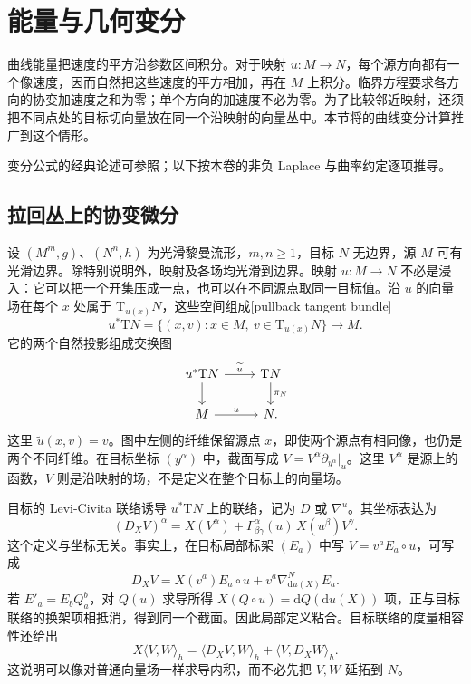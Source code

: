 
% 
% 

\section{能量与几何变分}
\label{g3:sec:1801}

曲线能量把速度的平方沿参数区间积分。对于映射 \(u:M\to N\)，每个源方向都有一个像速度，因而自然把这些速度的平方相加，再在 \(M\) 上积分。临界方程要求各方向的协变加速度之和为零；单个方向的加速度不必为零。为了比较邻近映射，还须把不同点处的目标切向量放在同一个沿映射的向量丛中。本节将的曲线变分计算推广到这个情形。

\ProseParagraphBreak

变分公式的经典论述可参照\cite[第2节，第115--117页；第6.C节，第135--136页]{EellsSampson1964HarmonicMaps}；以下按本卷的非负 Laplace 与曲率约定逐项推导。

\subsection{拉回丛上的协变微分}
\label{g3:subsec:1801:01}
设 \((M^m,g)\)、\((N^n,h)\) 为光滑黎曼流形，\(m,n\ge1\)，目标 \(N\) 无边界，源 \(M\) 可有光滑边界。除特别说明外，映射及各场均光滑到边界。映射 \(u:M\to N\) 不必是浸入：它可以把一个开集压成一点，也可以在不同源点取同一目标值。沿 \(u\) 的向量场在每个 \(x\) 处属于 \(\mathrm T_{u(x)}N\)，这些空间组成[pullback tangent bundle]
\[
	u^*\mathrm TN=\{(x,v):x\in M,\ v\in\mathrm T_{u(x)}N\}\longrightarrow M.
\]
它的两个自然投影组成交换图
\[
	\begin{tikzcd}
		u^*\mathrm TN \arrow[r,"\widetilde u"] \arrow[d] & \mathrm TN \arrow[d,"\pi_N"]\\
		M \arrow[r,"u"] & N.
	\end{tikzcd}
\]
这里 \(\widetilde u(x,v)=v\)。图中左侧的纤维保留源点 \(x\)，即使两个源点有相同像，也仍是两个不同纤维。在目标坐标 \((y^\alpha)\) 中，截面写成 \(V=V^\alpha\partial_{y^\alpha}|_u\)。这里 \(V^\alpha\) 是源上的函数，\(V\) 则是沿映射的场，不是定义在整个目标上的向量场。

\ProseParagraphBreak

目标的 Levi-Civita 联络诱导 \(u^*\mathrm TN\) 上的联络，记为 \(D\) 或 \(\nabla^u\)。其坐标表达为
\begin{equation}\label{g3:eq:pullback-connection-coordinates}
	(D_XV)^\alpha
	=X(V^\alpha)+\Gamma^\alpha_{\beta\gamma}(u)\,X(u^\beta)V^\gamma.
\end{equation}
这个定义与坐标无关。事实上，在目标局部标架 \((E_a)\) 中写 \(V=v^aE_a\circ u\)，可写成
\[
	D_XV=X(v^a)E_a\circ u+v^a\nabla^N_{\mathrm du(X)}E_a.
\]
若 \(E'_a=E_bQ^b_a\)，对 \(Q(u)\) 求导所得 \(X(Q\circ u)=\mathrm dQ(\mathrm du(X))\) 项，正与目标联络的换架项相抵消，得到同一个截面。因此局部定义粘合。目标联络的度量相容性还给出
\[
	X\langle V,W\rangle_h=\langle D_XV,W\rangle_h+\langle V,D_XW\rangle_h.
\]
这说明可以像对普通向量场一样求导内积，而不必先把 \(V,W\) 延拓到 \(N\)。

